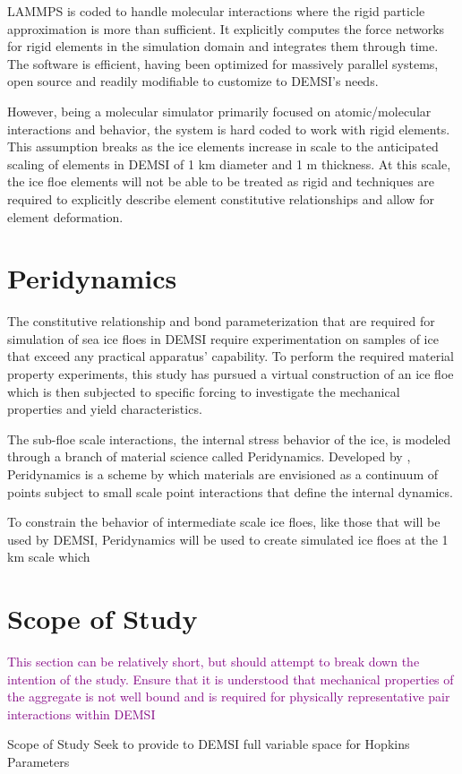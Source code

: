 \ac{LAMMPS} is coded to handle molecular interactions where the rigid particle approximation is more than sufficient.  It explicitly computes the force networks for rigid elements in the simulation domain and integrates them through time.  The software is efficient, having been optimized for massively parallel systems, open source and readily modifiable to customize to \ac{DEMSI}'s needs.

However, being a molecular simulator primarily focused on atomic/molecular interactions and behavior, the system is hard coded to work with rigid elements.  This assumption breaks as the ice elements increase in scale to the anticipated scaling of elements in \ac{DEMSI} of 1 km diameter and 1 m thickness.  At this scale, the ice floe elements will not be able to be treated as rigid and techniques are required to explicitly describe element constitutive relationships and allow for element deformation.

\section{Peridynamics}
The constitutive relationship and bond parameterization that are required for simulation of sea ice floes in \ac{DEMSI} require experimentation on samples of ice that exceed any practical apparatus' capability.  To perform the required material property experiments, this study has pursued a virtual construction of an ice floe which is then subjected to specific forcing to investigate the mechanical properties and yield characteristics.

The sub-floe scale interactions, the internal stress behavior of the ice, is modeled through a branch of material science called Peridynamics.  Developed by \cite{Silling2000}, Peridynamics is a scheme by which materials are envisioned as a continuum of points subject to small scale point interactions that define the internal dynamics.

To constrain the behavior of intermediate scale ice floes, like those that will be used by \ac{DEMSI}, Peridynamics will be used to create simulated ice floes at the 1 km scale which 
\pagebreak

\section{Scope of Study}
\textcolor{purple}{This section can be relatively short, but should attempt to break down the intention of the study.  Ensure that it is understood that mechanical properties of the aggregate is not well bound and is required for physically representative pair interactions within \ac{DEMSI}}
\begin{outline}[enumerate]
\1 Scope of Study
\2 Seek to provide to DEMSI full variable space for Hopkins Parameters
\end{outline}

